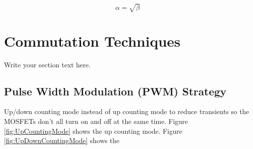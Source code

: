 \documentclass{article}
\begin{document}
		\begin{equation}
		\label{simple_equation}
		\alpha = \sqrt{ \beta }
		\end{equation}
	
	\section{Commutation Techniques}
	Write your section text here.
	
		\subsection{Pulse Width Modulation (PWM) Strategy}
		Up/down counting mode instead of up counting mode to reduce transients so the MOSFETs don't all turn on and off at the same time. Figure \ref{fig:UpCountingMode} shows the up counting mode.  Figure \ref{fig:UpDownCountingMode} shows the 
	
\end{document}
